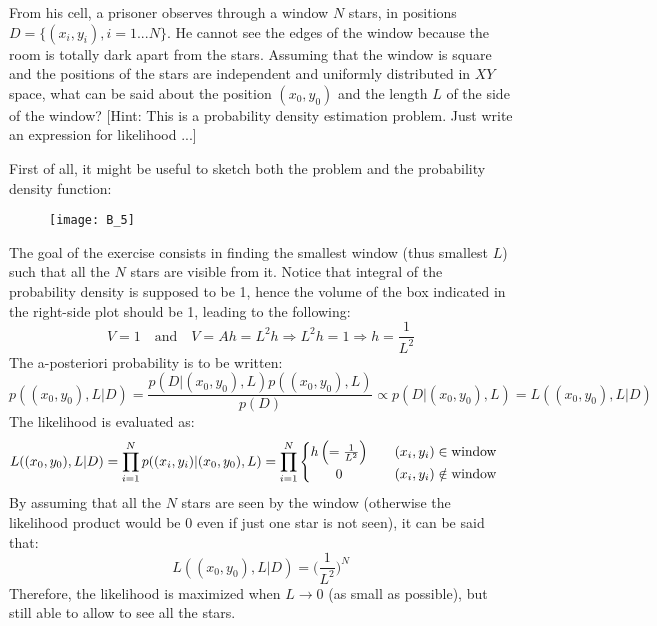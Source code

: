 \Exercise[number={5}]
From his cell, a prisoner observes through a window \(N\) stars, in positions
\(D = \{(x_i, y_i), i = 1...N\}\). He cannot see the edges of the window
because the room is totally dark apart from the stars. 
Assuming that the window is square and the positions of the stars are
independent and uniformly distributed in \(XY\) space, what can be said about
the position \((x_0, y_0)\) and the length \(L\) of the side of 
the window? [Hint: This is a probability density estimation problem.
Just write an expression for likelihood ...]

\Answer[number={5}]
First of all, it might be useful to sketch both the problem and the
probability density function:
\begin{figure}[H]
    \texttt{[image: B\_5]}
    \centering
\end{figure}
The goal of the exercise consists in finding the smallest window (thus
smallest \(L\)) such that all the \(N\) stars are visible from it.
Notice that integral of the probability density is supposed to be 1,
hence the volume of the box indicated in the right-side plot should be 1,
leading to the following:
\[
    V=1 \quad\text{and}\quad V=Ah=L^2h \Rightarrow L^2h=1 \Rightarrow h=\frac{1}{L^2}
\]
The a-posteriori probability is to be written:
\[
    p((x_0,y_0),L|D)=\frac{p(D|(x_0,y_0),L)p((x_0,y_0),L)}{p(D)}
    \propto
    p(D|(x_0,y_0),L) = L((x_0,y_0),L|D)
\]
The likelihood is evaluated as:
\[
    L((x_0,y_0),L|D) = \prod_{i=1}^{N}p((x_i,y_i)|(x_0,y_0),L)=\prod_{i=1}^{N}
    \begin{cases}
        \begin{matrix}
            h\,\Bigl(=\frac{1}{L^2}\Bigr) && (x_i, y_i)\in \text{window} \\
            0 && (x_i,y_i)\notin \text{window}
        \end{matrix}
    \end{cases}
\]
By assuming that all the \(N\) stars are seen by the window (otherwise the
likelihood product would be 0 even if just one star is not seen), it can
be said that:
\[
    L((x_0,y_0),L|D) = \biggl(\frac{1}{L^2}\biggr)^N
\]
Therefore, the likelihood is maximized when \(L\to{0}\) (as small as
possible), but still able to allow to see all the stars.